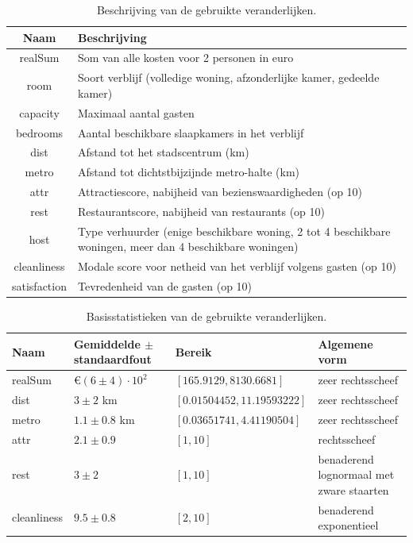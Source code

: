\documentclass[a4paper]{kulakarticle}
\begin{document}
\begin{table}[h]
	\centering
	\begin{tabular}{c|p{10cm}}
		\raggedright
		Naam & Beschrijving\\
		\hline
		realSum & Som van alle kosten voor 2 personen in euro\\ 
		room & Soort verblijf (volledige woning, afzonderlijke kamer, gedeelde kamer) \\ 
		capacity & Maximaal aantal gasten \\
		bedrooms & Aantal beschikbare slaapkamers in het verblijf \\
		dist & Afstand tot het stadscentrum (km) \\
		metro & Afstand tot dichtstbijzijnde metro-halte (km)\\
		attr & Attractiescore, nabijheid van bezienswaardigheden (op 10)\\
		rest & Restaurantscore, nabijheid van restaurants (op 10)\\ 
		host & Type verhuurder (enige beschikbare woning, 2 tot 4 beschikbare woningen, meer dan 4 beschikbare woningen) \\ 
		cleanliness & Modale score voor netheid van het verblijf volgens gasten (op 10) \\
		satisfaction & Tevredenheid van de gasten (op 10)\\
		
	\end{tabular}
	\caption{Beschrijving van de gebruikte veranderlijken.}
	\label{beschrijving}
\end{table}
\begin{table}[h]
	\centering
	\begin{tabular}{| l| l| l|  p{5cm} |}
		\hline
		Naam & Gemiddelde $\pm$ standaardfout  & Bereik & Algemene vorm\\  [1ex]
		\hline\hline
		realSum & €$(6 \pm 4) \cdot 10^{2} $ & $[165.9129, 8130.6681]$  &  zeer rechtsscheef\\    [0.5ex]
		\hline
		dist & $3 \pm 2$ km  & $[0.01504452, 11.19593222]$ & zeer rechtsscheef \\  [0.5ex]
		\hline
		metro & $1.1 \pm 0.8$ km & $[0.03651741, 4.41190504]$ & zeer rechtsscheef \\ [0.5ex]
		\hline
		attr & $2.1 \pm 0.9$ & $[1, 10]$  & rechtsscheef \\  [0.5ex]
		\hline
		rest & $3 \pm 2$ & $[1, 10]$ & benaderend lognormaal met zware staarten \\ [0.5ex]
		\hline
		cleanliness & $9.5 \pm 0.8$ & $[2, 10]$ & benaderend exponentieel  \\ [0.5ex]
		\hline
	\end{tabular}
	\caption{Basisstatistieken van de gebruikte veranderlijken.}
	\label{uitreksel}
\end{table}
\end{document}
